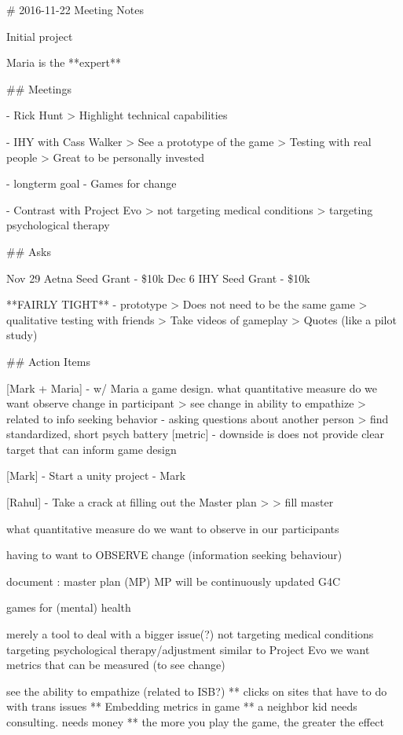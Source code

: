# 2016-11-22 Meeting Notes

Initial project

Maria is the **expert**

## Meetings

- Rick Hunt
    > Highlight technical capabilities

- IHY with Cass Walker
    > See a prototype of the game
    > Testing with real people
    > Great to be personally invested

- longterm goal - Games for change

- Contrast with Project Evo
   > not targeting medical conditions
   > targeting psychological therapy
   
## Asks

Nov 29 Aetna Seed Grant - \$10k
Dec 6 IHY Seed Grant - \$10k

**FAIRLY TIGHT**
- prototype
    > Does not need to be the same game
    > qualitative testing with friends
    > Take videos of gameplay
    > Quotes (like a pilot study)

## Action Items

 [Mark + Maria]
 - w/ Maria a game design. what quantitative measure do we want observe change in participant
    > see change in ability to empathize
    > related to info seeking behavior - asking questions about another person
    > find standardized, short psych battery [metric] 
       - downside is does not provide clear target that can inform game design

 [Mark]     
 - Start a unity project - Mark

 [Rahul]
 - Take a crack at filling out the Master plan
    > 
    > fill master

what quantitative measure do we want to observe in our participants

having to want to OBSERVE change
(information seeking behaviour)

document : master plan (MP)
MP will be continuously updated
G4C

games for (mental) health

merely a tool to deal with a bigger issue(?)
not targeting medical conditions
targeting psychological therapy/adjustment
similar to Project Evo we want metrics that can be measured (to see change)

see the ability to empathize (related to ISB?)
** clicks on sites that have to do with trans issues
** Embedding metrics in game
** a neighbor kid needs consulting. needs money 
** the more you play the game, the greater the effect

